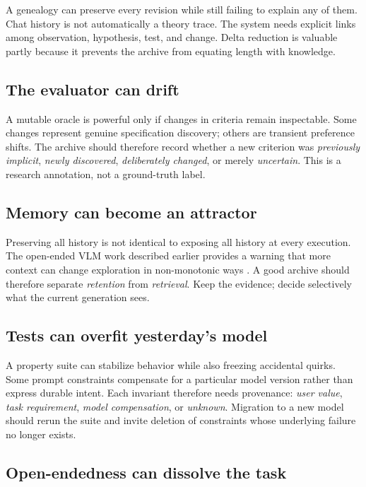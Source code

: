 \documentclass[11pt]{article}
\begin{document}
A genealogy can preserve every revision while still failing to explain any of them. Chat history is not automatically a theory trace. The system needs explicit links among observation, hypothesis, test, and change. Delta reduction is valuable partly because it prevents the archive from equating length with knowledge.

\subsection{The evaluator can drift}

A mutable oracle is powerful only if changes in criteria remain inspectable. Some changes represent genuine specification discovery; others are transient preference shifts. The archive should therefore record whether a new criterion was \emph{previously implicit}, \emph{newly discovered}, \emph{deliberately changed}, or merely \emph{uncertain}. This is a research annotation, not a ground-truth label.

\subsection{Memory can become an attractor}

Preserving all history is not identical to exposing all history at every execution. The open-ended VLM work described earlier provides a warning that more context can change exploration in non-monotonic ways \cite{earle2026picbreeder}. A good archive should therefore separate \emph{retention} from \emph{retrieval}. Keep the evidence; decide selectively what the current generation sees.

\subsection{Tests can overfit yesterday's model}

A property suite can stabilize behavior while also freezing accidental quirks. Some prompt constraints compensate for a particular model version rather than express durable intent. Each invariant therefore needs provenance: \emph{user value}, \emph{task requirement}, \emph{model compensation}, or \emph{unknown}. Migration to a new model should rerun the suite and invite deletion of constraints whose underlying failure no longer exists.

\subsection{Open-endedness can dissolve the task}
\end{document}

